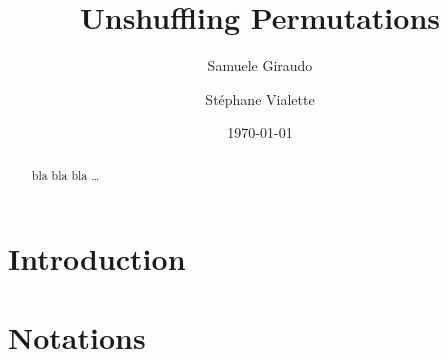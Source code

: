 \documentclass[a4paper,10pt]{llncs}
\DeclareMathOperator{\STD}{\mathrm{s}}
\begin{document}

\title{%
Unshuffling Permutations}%

\author{%
  Samuele Giraudo \and
  St\'ephane Vialette
}%
\date{\today}

\maketitle


\begin{abstract}
bla bla bla \ldots
\end{abstract}


\section{Introduction}
\label{section:Introduction}



\section{Notations}
\label{section:Notations}



\end{document}
